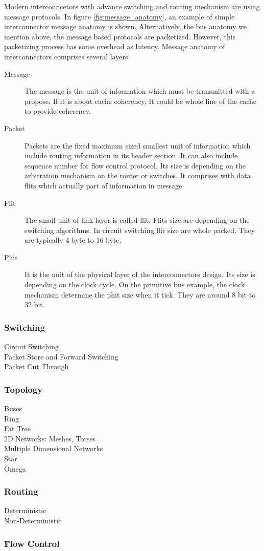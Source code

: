 Modern interconncetors with advance switching and routing mechanism are using message protocols.  In figure \ref{fig:message_anatomy}, an example of simple interconnector message anatomy is shown. Alternatively, the bus anatomy we mention above, the message based protocols are packetized. However, this packetizing process has some overhead as latency\cite{ComputerArchCoursera}. Message anatomy of interconnectors comprises several layers\cite{0122007514}.
\begin{description}
\item[Message]The message is the unit of information which must be transmitted with a propose. If it is about cache coherency, It could be whole line of the cache to provide coherency.
\item[Packet]Packets are the fixed maximum sized  smallest unit of information which include routing information in its header section. It can also include sequence number for flow control protocol. Its size is depending on the arbitration mechanism on the router or switches. It comprises with data flits which actually part of information in message.
\item[Flit]The small unit of link layer is called flit. Flits size are depending on the switching algorithms. In circuit switching flit size are whole packed. They are typically 4 byte to 16 byte.
\item[Phit]It is the unit of the physical layer of the interconnectors design. Its size is depending on the clock cycle. On the primitive bus example, the clock mechanism determine the phit size when it tick. They are around 8 bit to 32 bit.
\end{description}
 

\subsubsection{Switching}
\begin{description}
\item[Circuit Switching]
\item[Packet Store and Forward Switching]
\item[Packet Cut Through]
\end{description}
\subsubsection{Topology}
\begin{description}
\item[Buses]
\item[Ring]
\item[Fat Tree]
\item[2D Networks: Meshes, Torses]
\item[Multiple Dimensional Networks]
\item[Star]
\item[Omega]
\end{description}
\subsubsection{Routing}
\begin{description}
\item[Deterministic]
\item[Non-Deterministic]
\end{description}
\subsubsection{Flow Control}

